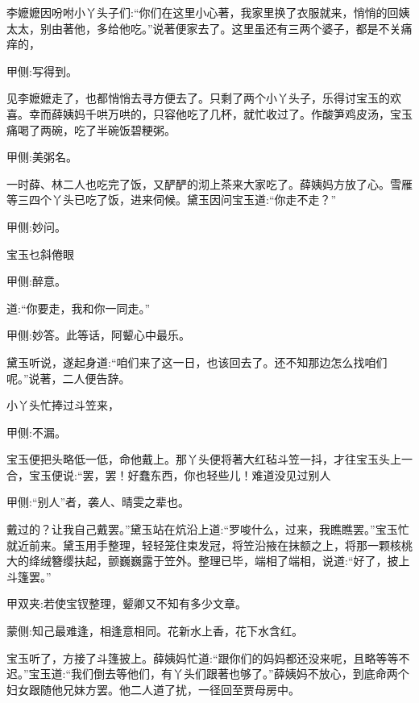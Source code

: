 \begin{parag}
    李嬷嬷因吩咐小丫头子们:“你们在这里小心著，我家里换了衣服就来，悄悄的回姨太太，别由著他，多给他吃。”说著便家去了。这里虽还有三两个婆子，都是不关痛痒的，\begin{note}甲侧:写得到。\end{note}见李嬷嬷走了，也都悄悄去寻方便去了。只剩了两个小丫头子，乐得讨宝玉的欢喜。幸而薛姨妈千哄万哄的，只容他吃了几杯，就忙收过了。作酸笋鸡皮汤，宝玉痛喝了两碗，吃了半碗饭碧粳粥。\begin{note}甲侧:美粥名。\end{note}一时薛、林二人也吃完了饭，又酽酽的沏上茶来大家吃了。薛姨妈方放了心。雪雁等三四个丫头已吃了饭，进来伺候。黛玉因问宝玉道:“你走不走？”\begin{note}甲侧:妙问。\end{note}宝玉乜斜倦眼\begin{note}甲侧:醉意。\end{note}道:“你要走，我和你一同走。”\begin{note}甲侧:妙答。此等话，阿颦心中最乐。\end{note}黛玉听说，遂起身道:“咱们来了这一日，也该回去了。还不知那边怎么找咱们呢。”说著，二人便告辞。
\end{parag}


\begin{parag}
    小丫头忙捧过斗笠来，\begin{note}甲侧:不漏。\end{note}宝玉便把头略低一低，命他戴上。那丫头便将著大红毡斗笠一抖，才往宝玉头上一合，宝玉便说:“罢，罢！好蠢东西，你也轻些儿！难道没见过别人\begin{note}甲侧:“别人”者，袭人、晴雯之辈也。\end{note}戴过的？让我自己戴罢。”黛玉站在炕沿上道:“罗唆什么，过来，我瞧瞧罢。”宝玉忙就近前来。黛玉用手整理，轻轻笼住束发冠，将笠沿掖在抹额之上，将那一颗核桃大的绛绒簪缨扶起，颤巍巍露于笠外。整理已毕，端相了端相，说道:“好了，披上斗篷罢。”\begin{note}甲双夹:若使宝钗整理，颦卿又不知有多少文章。\end{note}\begin{note}蒙侧:知己最难逢，相逢意相同。花新水上香，花下水含红。\end{note}宝玉听了，方接了斗篷披上。薛姨妈忙道:“跟你们的妈妈都还没来呢，且略等等不迟。”宝玉道:“我们倒去等他们，有丫头们跟著也够了。”薛姨妈不放心，到底命两个妇女跟随他兄妹方罢。他二人道了扰，一径回至贾母房中。
\end{parag}


